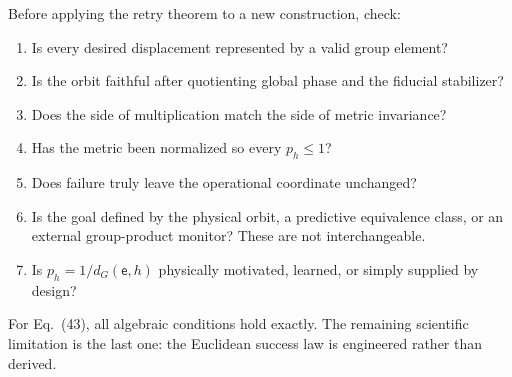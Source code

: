 \documentclass[11pt]{article}
\theoremstyle{definition}
\theoremstyle{remark}
\newcommand{\id}{\mathsf e}
\begin{document}
Before applying the retry theorem to a new construction, check:
\begin{enumerate}
\item Is every desired displacement represented by a valid group element?
\item Is the orbit faithful after quotienting global phase and the fiducial
stabilizer?
\item Does the side of multiplication match the side of metric invariance?
\item Has the metric been normalized so every \(p_h\le1\)?
\item Does failure truly leave the operational coordinate unchanged?
\item Is the goal defined by the physical orbit, a predictive equivalence
class, or an external group-product monitor?  These are not interchangeable.
\item Is \(p_h=1/d_G(\id,h)\) physically motivated, learned, or simply supplied
by design?
\end{enumerate}

For Eq.~(43), all algebraic conditions hold exactly.  The remaining scientific
limitation is the last one: the Euclidean success law is engineered rather
than derived.
\end{document}
